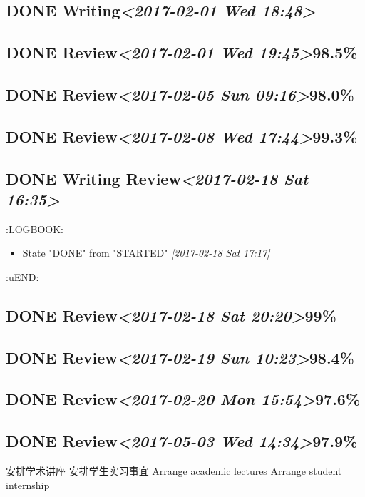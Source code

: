 \documentclass[11pt]{ctexart}
\begin{document}
\subsection{{\bfseries\sffamily DONE} Writing\textit{<2017-02-01 Wed 18:48>}}
\label{sec:org1e0d91d}
\subsection{{\bfseries\sffamily DONE} Review\textit{<2017-02-01 Wed 19:45>}98.5\%}
\label{sec:orgd10cfe2}
\subsection{{\bfseries\sffamily DONE} Review\textit{<2017-02-05 Sun 09:16>}98.0\%}
\label{sec:orga024a50}
\subsection{{\bfseries\sffamily DONE} Review\textit{<2017-02-08 Wed 17:44>}99.3\%}
\label{sec:orgd7ae515}

\subsection{{\bfseries\sffamily DONE} Writing Review\textit{<2017-02-18 Sat 16:35>}}
\label{sec:org500fbc3}
:LOGBOOK:
\begin{itemize}
\item State "DONE"       from "STARTED"    \textit{[2017-02-18 Sat 17:17]}
\end{itemize}
:uEND:
\subsection{{\bfseries\sffamily DONE} Review\textit{<2017-02-18 Sat 20:20>}99\%}
\label{sec:org1ddba6c}
\subsection{{\bfseries\sffamily DONE} Review\textit{<2017-02-19 Sun 10:23>}98.4\%}
\label{sec:org3ce8d02}
\subsection{{\bfseries\sffamily DONE} Review\textit{<2017-02-20 Mon 15:54>}97.6\%}
\label{sec:org37fdbae}
\subsection{{\bfseries\sffamily DONE} Review\textit{<2017-05-03 Wed 14:34>}97.9\%}
\label{sec:orgd27bf3b}
安排学术讲座
安排学生实习事宜
Arrange academic lectures
Arrange student internship
\end{document}

